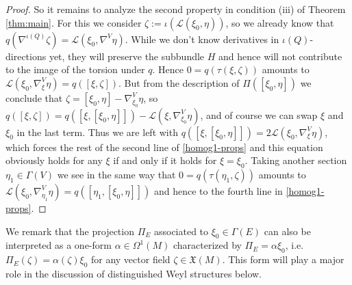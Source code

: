 \documentclass[11pt]{amsart}
\numberwithin{proposition}{section}
\numberwithin{equation}{section}
\begin{document}
\begin{proof}
So it remains to analyze the second property in condition (iii) of Theorem \ref{thm:main}. For this we consider $\zeta:=\iota(\mathcal L(\xi_0,\eta))$, so we already know that $q(\nabla^{\iota(Q)}\zeta)=\mathcal L(\xi_0,\nabla^V\eta)$. While we don't know derivatives in $\iota(Q)$-directions yet, they will preserve the subbundle $H$ and hence will not contribute to the image of the torsion under $q$. Hence $0=q(\tau(\xi,\zeta))$ amounts to $\mathcal L(\xi_0,\nabla^V_\xi\eta)=q([\xi,\zeta])$. But from the description of $\Pi([\xi_0,\eta])$ we conclude that $\zeta=[\xi_0,\eta]-\nabla^V_{\xi_0}\eta$, so $q([\xi,\zeta])=q([\xi,[\xi_0,\eta]])-\mathcal L(\xi,\nabla^V_{\xi_0}\eta)$, and of course we can swap $\xi$ and $\xi_0$ in the last term. Thus we are left with $q([\xi,[\xi_0,\eta]])=2\mathcal L(\xi_0,\nabla^V_\xi\eta)$, which forces the rest of the second line of \eqref{homog1-props} and this equation obviously holds for any $\xi$ if and only if it holds for $\xi=\xi_0$. Taking another section $\eta_1\in\Gamma(V)$ we see in the same way that $0=q(\tau(\eta_1,\zeta))$ amounts to $\mathcal L(\xi_0,\nabla^V_{\eta_1}\eta)=q([\eta_1,[\xi_0,\eta]])$ and hence to the fourth line in \eqref{homog1-props}. 
\end{proof}

We remark that the projection $\Pi_E$ associated to $\xi_0\in\Gamma(E)$ can also be interpreted as a one-form $\alpha\in\Omega^1(M)$ characterized by $\Pi_E=\alpha\xi_0$, i.e.\ $\Pi_E(\zeta)=\alpha(\zeta)\xi_0$ for any vector field $\zeta\in\mathfrak X(M)$. This form will play a major role in the discussion of distinguished Weyl structures below. 
\end{document}
